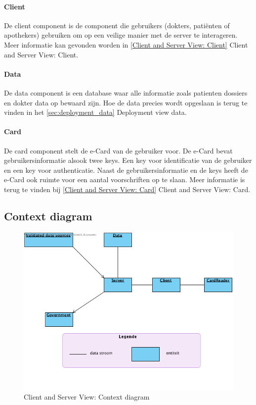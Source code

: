 \documentclass[a4paper,10pt]{article}
\begin{document}
\paragraph{Client}
De client component is de component die gebruikers (dokters, pati\"{e}nten of apothekers) gebruiken om op een veilige manier met de server te interageren.  Meer informatie kan gevonden worden in \ref{Client and Server View: Client} Client and Server View: Client.

\paragraph{Data}
De data component is een database waar alle informatie zoals patienten dossiers en dokter data op bewaard zijn.  Hoe de data precies wordt opgeslaan is terug te vinden in het \ref{sec:deployment_data} Deployment view data.

\paragraph{Card}
De card component stelt de e-Card van de gebruiker voor.  De e-Card bevat gebruikersinformatie alsook twee keys.  Een key voor identificatie van de gebruiker en een key voor authenticatie.  Naast de gebruikersinformatie en de keys heeft de e-Card ook ruimte voor een aantal voorschriften op te slaan.  Meer informatie is terug te vinden bij \ref{Client and Server View: Card} Client and Server View: Card.

\subsection{Context diagram}

\begin{figure}[!ht]
  \includegraphics[width=\textwidth]{../images/ClientServer_Context.png}
  \caption{Client and Server View: Context diagram}
\end{figure}
\end{document}
